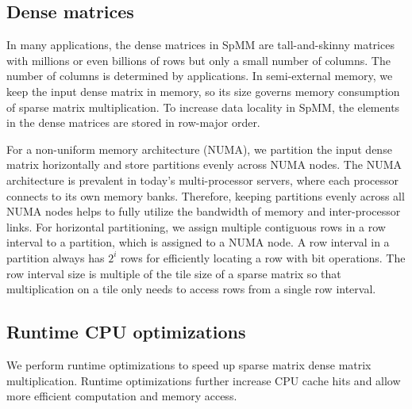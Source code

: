 \subsection{Dense matrices}
In many applications, the dense matrices in SpMM are
tall-and-skinny matrices with millions or even billions of rows but only a small
number of columns. The number of columns is determined by applications.
In semi-external memory,
we keep the input dense matrix in memory, so its size governs memory consumption
of sparse matrix multiplication. To increase data locality in SpMM, the elements
in the dense matrices are stored in row-major order.

For a non-uniform memory architecture (NUMA), we partition the input dense matrix
horizontally and store partitions evenly across NUMA nodes. The NUMA architecture
is prevalent in today's multi-processor servers, where each processor connects
to its own memory banks. Therefore, keeping partitions evenly across all NUMA
nodes helps to fully utilize the bandwidth of memory and inter-processor links.
For horizontal partitioning, we assign multiple contiguous rows in a row
interval to a partition, which is assigned to a NUMA node. A row interval
in a partition always has $2^i$ rows for efficiently locating a row
with bit operations. The row interval size is multiple of the tile size of
a sparse matrix so that multiplication on a tile only needs to access rows
from a single row interval.


\subsection{Runtime CPU optimizations} \label{sec:cpu}
We perform runtime optimizations to speed up sparse matrix
dense matrix multiplication. Runtime optimizations further increase
CPU cache hits and allow more efficient computation and memory access.

